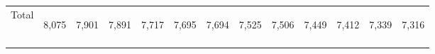 \begin{center}
\begin{tabular}{lcccccccccccc}
Total & \begin{bf}8,075\end{bf} & \begin{rm}7,901\end{rm} & \begin{bf}7,891\end{bf} & \begin{rm}7,717\end{rm} & \begin{bf}7,695\end{bf} & \begin{rm}7,694\end{rm} & \begin{bf}7,525\end{bf} & \begin{rm}7,506\end{rm} & \begin{bf}7,449\end{bf} & \begin{rm}7,412\end{rm} & \begin{bf}7,339\end{bf} & \begin{rm}7,316\end{rm}\\
\noalign{\smallskip}\hline\end{tabular}\\
\end{center}
